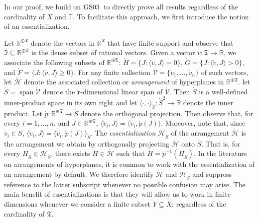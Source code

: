 \documentclass[ecta,nameyear,draft]{econsocart}
\newcommand{\R}{\mathbb R}
\newcommand{\mc}{\mathcal}
\newcommand{\spann}{\operatorname{span}}
\newcommand{\mbbt}{{\mathds {T}}}
\newcommand{\mbbtpp}{{\mathfrak{T}}}
\newcommand{\mbbjpp}{\mathfrak{I}}
\newcommand{\gsii}{$\textup{GS03}$}
\theoremstyle{plain}
\theoremstyle{remark}
\begin{document}
\begin{appendix}
  In our proof, we build on \gsii\ to directly prove all results regardless of
  the cardinality of $X$ and $\mbbt$. To facilitate this approach, we first 
  introduce the notion of an essentialization.

  Let $\R^{\oplus\mbbtpp}$ denote the vectors in $\R^{\mbbtpp}$ that have
  finite support and observe that $\mbbjpp \subseteq \R^{\oplus\mbbtpp}$ is the
  dense subset of rational vectors.  Given a vector $\acute{v}: \mbbtpp
  \rightarrow \R$, we associate the following subsets of $\R^{\oplus\mbbtpp}$:
  $\acute H = \{J : \langle \acute v , J \rangle = 0 \}$, $\acute G = \{J :
  \langle \acute v, J \rangle > 0\}$, and $\acute F = \{J : \langle \acute v,
  J \rangle \geq 0\}$. For any finite collection $\acute{\mc V} = \{\acute{v}_1,
  \dots, \acute{v}_n\}$ of such vectors, let $\acute{\mc H}$ denote the
  associated collection or \emph{arrangement} of hyperplanes in
  $\R^{\oplus\mbbtpp}$. let $\acute{S} = \spann \acute{\mc V}$ denote the
  $\acute{\mathbf{r}}$-dimensional linear span of $\acute{\mc V}$. Then
  $\acute S$ is a well-defined inner-product space in its own right and let
  $\langle \cdot , \cdot \rangle_{\acute{S}}: \acute{S}^2 \rightarrow \R$ denote
  the inner product. Let $\acute{p}: \R^{\oplus\mbbtpp} \rightarrow \acute{S}$
  denote the orthogonal projection. Then observe that, for every $i = 1, \dots,
  n$, and $J \in \R^{\oplus\mbbtpp}$, $\langle \acute{v}_i, J \rangle = \langle
  \acute{v}_i, \acute{p}(J)\rangle$. Moreover, note that, since $\acute{v}_i \in
  S$, $\langle \acute{v}_i, J \rangle = \langle \acute{v}_i, \acute{p}(J)
  \rangle_{\acute{S}}$.  The \emph{essentialization} ${\mc H}_{\acute{S}}$ of
  the arrangement $\acute{\mc H}$ is the arrangement we obtain by orthogonally
  projecting $\acute{\mc H}$ onto $\acute{S}$.  That is, for every $H_{\acute{S}}
  \in {\mc H}_{\acute{S}}$, there exists $\acute{H} \in \acute{\mc H}$ such that
  $\acute{H} = \acute{p}^{-1}(H_{\acute{S}})$.  In the literature on
  arrangements of hyperplanes, it is common to work with the essentialization
  of an arrangement by default.  We therefore identify $\acute{\mc H}$ and
  $\mc{H}_{\acute{S}}$ and suppress reference to the latter subscript
  whenever no possible confusion may arise. The main benefit of
  essentializations is that they will allow us to work in finite dimensions
  whenever we consider a finite subset $Y\subseteq X$: regardless of the
  cardinality of $\mbbtpp$.

\end{appendix}
\end{document}
